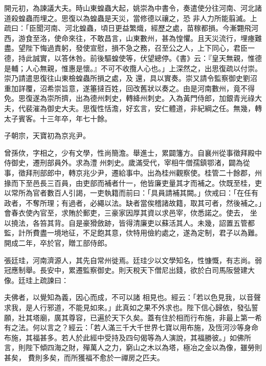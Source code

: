 \begin{pinyinscope}
 開元初，為諫議大夫。時山東蝗蟲大起，姚崇為中書令，奏遣使分往河南、河北諸道殺蝗蟲而埋之。思復以為蝗蟲是天災，當修德以禳之，恐
 非人力所能翦滅。上疏曰：「臣聞河南、河北蝗蟲，頃日更益繁熾，經歷之處，苗稼都損。今漸翾飛河西，游食至洛，使命來往，不敢昌言，山東數州，甚為惶懼。且天災流行，埋瘞難盡。望陛下悔過責躬，發使宣慰，損不急之務，召至公之人，上下同心，君臣一德，持此誠實，以答休咎。前後驅蝗使等，伏望總停。《書》云：『皇天無親，惟德是輔；人心無親，惟惠是懷。』不可不收攬人心也。」上深然之，出思復疏以付崇。崇乃請遣思復往山東檢蝗蟲所損之處，及
 還，具以實奏。崇又請令監察御史劉沼重加詳覆，沼希崇旨意，遂箠撻百姓，回改舊狀以奏之。由是河南數州，竟不得免。思復遂為崇所擠，出為德州刺史，轉絳州刺史。入為黃門侍郎，加銀青光祿大夫，代裴漼為御史大夫。思復性恬澹，好玄言，安仁體道，非紀綱之任。無幾，轉太子賓客。十三年卒，年七十餘。



 子朝宗，天寶初為京兆尹。



 曾孫佽，字相之，少有文學，性尚簡澹。舉進士，累闢籓方。自襄州從事徵拜殿中侍御史，遷刑部員外。求為澧
 州刺史。歲滿受代，宰相牛僧孺鎮鄂渚，闢為從事，徵拜刑部郎中，轉京兆少尹，遷給事中。出為桂州觀察使。桂管二十餘郡，州掾而下至邑長三百員，由吏部而補者什一，他皆廉吏量其才而補之。佽既至桂，吏以常所為官者數百人引謁，一吏執籍而前曰：「具員請補其闕。」佽戒曰：「在任有政者，不奪所理；有過者，必繩以法。缺者當俟稽諸故籍，取其可者，然後補之。」會春衣使內官至，求賄於郵吏，三豪家因厚其資以求邑宰，佽悉諾之。使去，
 坐以撓法，各笞其背。自是豪猾斂跡，皆得清廉吏以蘇活其人。未幾，詔置五管都監，計所費盡一境地征，不足飽其意，佽特用儉約處之，遂為定制，君子以為難。開成二年，卒於官，贈工部侍郎。



 張廷珪，河南濟源人，其先自常州徙焉。廷珪少以文學知名，性慷慨，有志尚。弱冠應制舉。長安中，累遷監察御史。則天稅天下僧尼出錢，欲於白司馬阪營建大像。廷珪上疏諫曰：



 夫佛者，以覺知為義，因心而成，不可以諸
 相見也。經云：「若以色見我，以音聲求我，是人行邪道，不能見如來。」此真如之果不外求也。陛下信心歸依，發弘誓願，壯其塔廟，廣其尊容，已遍於天下久矣。蓋有住於相而行布施，非最上第一希有之法。何以言之？經云：「若人滿三千大千世界七寶以用布施，及恆河沙等身命布施，其福甚多。若人於此經中受持及四句偈等為人演說，其福勝彼。」如佛所言，則陛下傾四海之財，殫萬人之力，窮山之木以為塔，極冶之金以為像，雖勞則甚矣，
 費則多矣，而所獲福不愈於一禪房之匹夫。




\end{pinyinscope}
